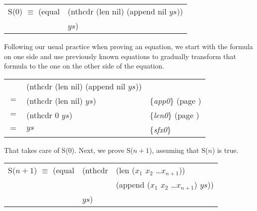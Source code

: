 \begin{center}
\begin{tabular}{ll}
S(0) $\equiv$ (equal & (nthcdr (len nil) (append nil $ys$)) \\
                     & $ys$)                                \\
\end{tabular}
\end{center}

Following our usual practice when proving an equation, we start with the formula on one side and use previously known equations to gradually transform that formula to the one on the other side of the equation.

\begin{center}
\begin{tabular}{lll}
    & (nthcdr (len nil) (append nil $ys$))  &                                                      \\
$=$ & (nthcdr (len nil) $ys$)               & \{\emph{app0}\} (page \pageref{append-equations})\\
$=$ & (nthcdr 0 $ys$)                       & \{\emph{len0}\} (page \pageref{len-equations})   \\
$=$ & $ys$                                  & \{\emph{sfx0}\}                                      \\
\end{tabular}
\end{center}

That takes care of S(0). Next, we prove S($n+1$), assuming that S($n$) is true.

\begin{center}
\begin{tabular}{lll}
S($n+1$) $\equiv$ (equal & (nthcdr & (len ($x_1$ $x_2$ \dots $x_{n+1}$))          \\
                         &         & (append ($x_1$ $x_2$ \dots $x_{n+1}$) $ys$)) \\
                         & $ys$)   &                                              \\
\end{tabular}
\end{center}


